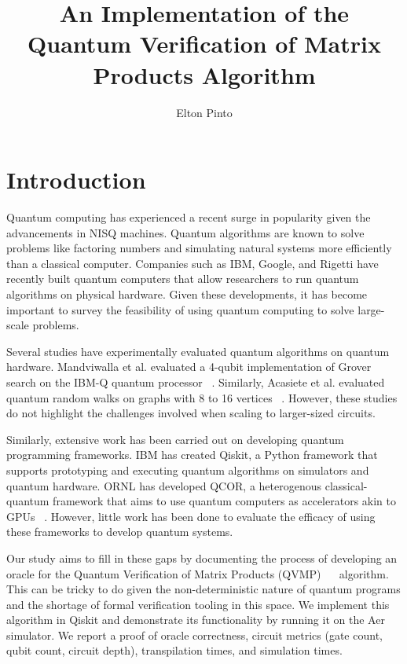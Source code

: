 \documentclass[11pt]{article}
\title{An Implementation of the Quantum Verification of Matrix Products Algorithm}
\author{Elton Pinto}
\date{}
\theoremstyle{definition}
\theoremstyle{remark}
\begin{document}
\maketitle

\section{Introduction}

Quantum computing has experienced a recent surge in popularity given the
advancements in NISQ machines. Quantum algorithms are known to solve problems
like factoring numbers and simulating natural systems more efficiently than a
classical computer. Companies such as IBM, Google, and Rigetti have recently
built quantum computers that allow researchers to run quantum algorithms on
physical hardware. Given these developments, it has become important to survey
the feasibility of using quantum computing to solve large-scale problems.

Several studies have experimentally evaluated quantum algorithms on quantum
hardware. Mandviwalla et al. evaluated a 4-qubit implementation of Grover
search on the IBM-Q quantum processor ~\cite{mandviwalla2018implementing}.
Similarly, Acasiete et al. evaluated quantum random walks on graphs with 8 to
16 vertices ~\cite{acasiete2020implementation}. However, these studies do not
highlight the challenges involved when scaling to larger-sized circuits.

Similarly, extensive work has been carried out on developing quantum programming
frameworks. IBM has created Qiskit, a Python framework that supports prototyping
and executing quantum algorithms on simulators and quantum hardware. ORNL has
developed QCOR, a heterogenous classical-quantum framework that aims to use
quantum computers as accelerators akin to GPUs ~\cite{mintz2020qcor}. However,
little work has been done to evaluate the efficacy of using these frameworks to
develop quantum systems.

Our study aims to fill in these gaps by documenting the process of developing an
oracle for the Quantum Verification of Matrix Products (QVMP)
~\cite{buhrman2005quantum}~\cite{ambainis2002quantummatrix} algorithm. This can be
tricky to do given the non-deterministic nature of quantum programs and the
shortage of formal verification tooling in this space. We implement this
algorithm in Qiskit and demonstrate its functionality by running it on the Aer
simulator. We report a proof of oracle correctness, circuit metrics (gate count,
qubit count, circuit depth), transpilation times, and simulation times.
\end{document}
